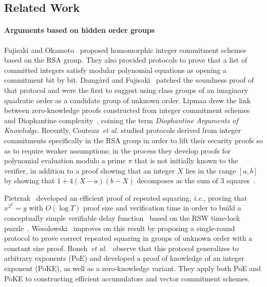 \subsection{Related Work}

\paragraph{Arguments based on hidden order groups} 
Fujisaki and Okamoto~\cite{C:FujOka97} proposed homomorphic integer commitment schemes based on the RSA group. They also provided protocols to prove that a list of committed integers satisfy modular polynomial equations as opening a commitment bit by bit. Damgård and Fujisaki~\cite{AC:DamFuj02} patched the soundness proof of that protocol and were the first to suggest using class groups of an imaginary quadratic order as a candidate group of unknown order. Lipmaa drew the link between zero-knowledge proofs constructed from integer commitment schemes and Diophantine complexity~\cite{AC:Lipmaa03a}, coining the term \emph{Diophantine Arguments of Knowledge}. Recently, Couteau~\emph{et al.} studied protocols derived from integer commitments specifically in the RSA group in order to lift their security proofs so as to require weaker assumptions; in the process they develop proofs for polynomial evaluation modulo a prime $\pi$ that is not initially known to the verifier, in addition to a proof showing that an integer $X$ lies in the range $[a,b]$ by showing that $1+4(X-a)(b-X)$ decomposes as the sum of 3 squares~\cite{EC:CouPetPoi17}.

Pietrzak~\cite{ITCS:Pietrzak18} developed an efficient proof of repeated squaring, \emph{i.e.}, proving that $x^{2^T} = y$ with $O(\log T)$ proof size and verification time in order to build a conceptually simple verifiable delay function~\cite{C:BBBF18} based on the RSW time-lock puzzle~\cite{RivShaWag96}. Wesolowski~\cite{EC:Wesolowski19} improves on this result by proposing a single-round protocol to prove correct repeated squaring in groups of unknown order with a constant size proof. Boneh~\emph{et al.}~\cite{C:BonBunFis19} observe that this protocol generalizes to arbitrary exponents (PoE) and developed a proof of knowledge of an integer exponent (PoKE), as well as a zero-knowledge variant. They apply both PoE and PoKE to constructing efficient accumulators and vector commitment schemes.

